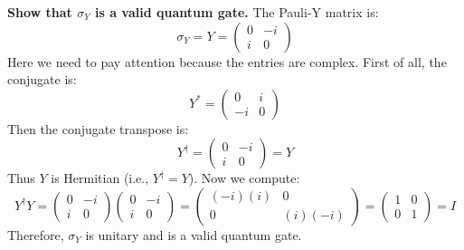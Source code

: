 \highspace
\textbf{Show that $\sigma_Y$ is a valid quantum gate.} The Pauli-Y matrix is:
\begin{equation*}
    \sigma_{Y} = Y =
    \begin{pmatrix}
        0 & -i \\
        i & 0
    \end{pmatrix}
\end{equation*}
Here we need to pay attention because the entries are complex. First of all, the conjugate is:
\begin{equation*}
    Y^{*} =
    \begin{pmatrix}
        0 & i \\
        -i & 0
    \end{pmatrix}
\end{equation*}
Then the conjugate transpose is:
\begin{equation*}
    Y^{\dagger} =
    \begin{pmatrix}
        0 & -i \\
        i & 0
    \end{pmatrix}
    = Y
\end{equation*}
Thus $Y$ is Hermitian (i.e., $Y^{\dagger} = Y$). Now we compute:
\begin{equation*}
    Y^{\dagger}Y =
    \begin{pmatrix}
        0 & -i \\
        i & 0
    \end{pmatrix}
    \begin{pmatrix}
        0 & -i \\
        i & 0
    \end{pmatrix}
    =
    \begin{pmatrix}
        (-i)(i) & 0 \\
        0 & (i)(-i)
    \end{pmatrix}
    =
    \begin{pmatrix}
        1 & 0 \\
        0 & 1
    \end{pmatrix}
    = I
\end{equation*}
Therefore, $\sigma_Y$ is unitary and is a valid quantum gate.

